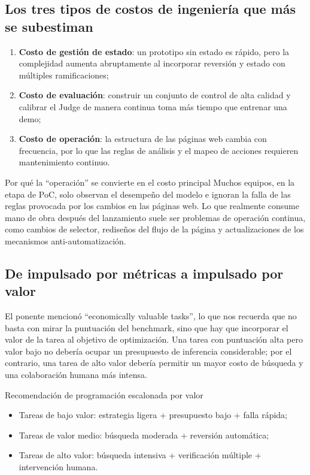 \subsection{Los tres tipos de costos de ingeniería que más se subestiman}
\begin{enumerate}
    \item \textbf{Costo de gestión de estado}: un prototipo sin estado es rápido, pero la complejidad aumenta abruptamente al incorporar reversión y estado con múltiples ramificaciones;
    \item \textbf{Costo de evaluación}: construir un conjunto de control de alta calidad y calibrar el Judge de manera continua toma más tiempo que entrenar una demo;
    \item \textbf{Costo de operación}: la estructura de las páginas web cambia con frecuencia, por lo que las reglas de análisis y el mapeo de acciones requieren mantenimiento continuo.
\end{enumerate}

\begin{knowledgebox}{Por qué la ``operación'' se convierte en el costo principal}
Muchos equipos, en la etapa de PoC, solo observan el desempeño del modelo e ignoran la falla de las reglas provocada por los cambios en las páginas web. Lo que realmente consume mano de obra después del lanzamiento suele ser problemas de operación continua, como cambios de selector, rediseños del flujo de la página y actualizaciones de los mecanismos anti-automatización.
\end{knowledgebox}

\subsection{De impulsado por métricas a impulsado por valor}
El ponente mencionó ``economically valuable tasks'', lo que nos recuerda que no basta con mirar la puntuación del benchmark, sino que hay que incorporar el valor de la tarea al objetivo de optimización. Una tarea con puntuación alta pero valor bajo no debería ocupar un presupuesto de inferencia considerable; por el contrario, una tarea de alto valor debería permitir un mayor costo de búsqueda y una colaboración humana más intensa.

\begin{importantbox}{Recomendación de programación escalonada por valor}
\begin{itemize}
    \item Tareas de bajo valor: estrategia ligera + presupuesto bajo + falla rápida;
    \item Tareas de valor medio: búsqueda moderada + reversión automática;
    \item Tareas de alto valor: búsqueda intensiva + verificación múltiple + intervención humana.
\end{itemize}
\end{importantbox}

